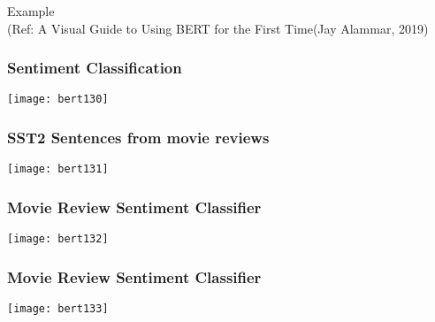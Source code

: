 \begin{frame}[fragile]\frametitle{}
\begin{center}
{\Large Example} \\
{\small (Ref: A Visual Guide to Using BERT for the First Time(Jay Alammar, 2019)}
\end{center}
\end{frame}


\begin{frame}[fragile]\frametitle{Sentiment Classification}

			\begin{center}
			\texttt{[image: bert130]}
			\end{center}	


\end{frame}

\begin{frame}[fragile]\frametitle{ SST2 Sentences from movie reviews}

			\begin{center}
			\texttt{[image: bert131]}
			\end{center}	


\end{frame}

\begin{frame}[fragile]\frametitle{ Movie Review Sentiment Classifier}

			\begin{center}
			\texttt{[image: bert132]}
			\end{center}	


\end{frame}

\begin{frame}[fragile]\frametitle{ Movie Review Sentiment Classifier}

			\begin{center}
			\texttt{[image: bert133]}
			\end{center}	


\end{frame}

